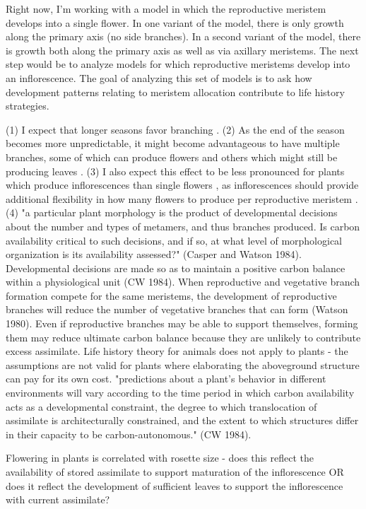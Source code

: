 \documentclass[12pt, oneside]{article}   	%
\begin{document}
Right now, I'm working with a model in which the reproductive meristem develops into a single flower. In one variant of the model, there is only growth along the primary axis (no side branches). In a second variant of the model, there is growth both along the primary axis as well as via axillary meristems. The next step would be to analyze models for which reproductive meristems develop into an inflorescence. The goal of analyzing this set of models is to ask how development patterns relating to meristem allocation contribute to life history strategies. 

(1) I expect that longer seasons favor branching \cite{Geber1990}. 
(2) As the end of the season becomes more unpredictable, it might become advantageous to have multiple branches, some of which can produce flowers and others which might still be producing leaves \cite{Geber1990}. 
(3) I also expect this effect to be less pronounced for plants which produce inflorescences than single flowers \cite{bonser2006}, as inflorescences should provide additional flexibility in how many flowers to produce per reproductive meristem \cite{bonser2006,salomonson1994}.
(4) "a particular plant morphology is the product of developmental decisions about the number and types of metamers, and thus branches produced. Is carbon availability critical to such decisions, and if so, at what level of morphological organization is its availability assessed?" (Casper and Watson 1984). Developmental decisions are made so as to maintain a positive carbon balance within a physiological  unit (CW 1984). When reproductive and vegetative branch formation compete for the same meristems, the development of reproductive branches will reduce the number of vegetative branches that can form (Watson 1980). Even if reproductive branches may be able to support themselves, forming them may reduce ultimate carbon balance because they are unlikely to contribute excess assimilate. Life history theory for animals does not apply to plants - the assumptions are not valid for plants where elaborating the aboveground structure can pay for its own cost. "predictions about a plant's behavior in different environments will vary according to the time period in which carbon availability acts as a developmental constraint, the degree to which translocation of assimilate is architecturally constrained, and the extent to which structures differ in their capacity to be carbon-autonomous." (CW 1984).

Flowering in plants is correlated with rosette size - does this reflect the availability of stored assimilate to support maturation of the inflorescence OR does it reflect the development of sufficient leaves to support the inflorescence with current assimilate?
\end{document}
